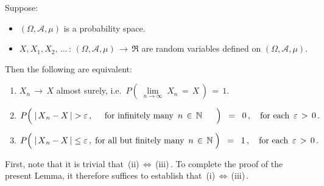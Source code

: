 \vskip 1.0cm
\begin{lemma}\label{lemma:CharacterizationOfAlmostSureConvergence}
\mbox{}\vskip 0.1cm
\noindent
Suppose:
\begin{itemize}
\item
	$(\Omega,\mathcal{A},\mu)$ is a probability space.
\item
	$X, X_{1}, X_{2}, \,\ldots\,:\, (\Omega,\mathcal{A},\mu) \,\longrightarrow\,\Re$
	are random variables defined on $(\Omega,\mathcal{A},\mu)$.
\end{itemize}
Then the following are equivalent:
\begin{enumerate}
\item
	$X_{n} \,\longrightarrow\,X$ almost surely,
	i.e. \,$P\!\left(\;\underset{n\rightarrow\infty}{\lim}\;X_{n} \,=\, X\,\right) \, = \, 1$.
\item
	\begin{equation*}
	P\!\left(\;
		\vert\,\overset{{\color{white}.}}{X}_{n} - X\,\vert > \varepsilon\,,
		{\color{white}....}
		\;\textnormal{for infinitely many \,$n \,\in\, \N$}
		{\color{white}.....}
		\;\right)
	\;\; = \;\; 0\,,
	\quad\textnormal{for each \,$\varepsilon \,>\, 0$}\,.
	\end{equation*}
\item
	\begin{equation*}
	P\!\left(\;
		\vert\,\overset{{\color{white}.}}{X}_{n} - X\,\vert \leq \varepsilon\,,
		\;\textnormal{for all but finitely many \,$n \,\in\, \N$}
		\;\right)
	\;\; = \;\; 1\,,
	\quad\textnormal{for each \,$\varepsilon \,>\, 0$}\,.
	\end{equation*}
\end{enumerate}
\end{lemma}
\proof
First, note that it is trivial that \,(ii)\,$\Longleftrightarrow$\,(iii)\,.
To complete the proof of the present Lemma, it therefore suffices to establish that \,(i)\,$\Longleftrightarrow$\,(iii)\,.

